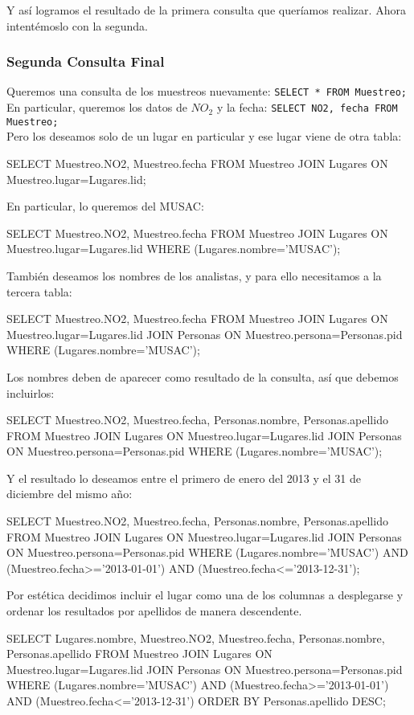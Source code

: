 \documentclass[10pt,letterpaper]{article}
\newcommand{\inlinecode}[1]{
\colorbox{light-gray}{\texttt{#1}}
}
\newenvironment{Code}
{
\begin{lrbox}{\selvestebox}%
\begin{minipage}{\dimexpr\columnwidth-2\fboxsep\relax}
\fontfamily{\ttdefault}\selectfont
}
{\end{minipage}\end{lrbox}%
\begin{center}
\colorbox{light-gray}{\usebox{\selvestebox}}
\end{center}
}
\begin{document}
Y as\'i logramos el resultado de la primera consulta que quer\'iamos realizar. Ahora intent\'emoslo con la segunda.\\

\subsubsection{Segunda Consulta Final}

\noindent Queremos una consulta de los muestreos nuevamente: \inlinecode{SELECT * FROM Muestreo;}\\
En particular, queremos los datos de $NO_2$ y la fecha: \inlinecode{SELECT NO2, fecha FROM Muestreo;}\\
Pero los deseamos solo de un lugar en particular y ese lugar viene de otra tabla:
\begin{Code}
SELECT Muestreo.NO2, Muestreo.fecha FROM Muestreo JOIN Lugares ON Muestreo.lugar=Lugares.lid;
\end{Code}
En particular, lo queremos del MUSAC:
\begin{Code}
SELECT Muestreo.NO2, Muestreo.fecha FROM Muestreo JOIN Lugares ON Muestreo.lugar=Lugares.lid WHERE (Lugares.nombre='MUSAC');
\end{Code}
Tambi\'en deseamos los nombres de los analistas, y para ello necesitamos a la tercera tabla:
\begin{Code}
SELECT Muestreo.NO2, Muestreo.fecha FROM Muestreo JOIN Lugares ON Muestreo.lugar=Lugares.lid JOIN Personas ON Muestreo.persona=Personas.pid WHERE (Lugares.nombre='MUSAC');
\end{Code}
Los nombres deben de aparecer como resultado de la consulta, as\'i que debemos incluirlos:
\begin{Code}
SELECT Muestreo.NO2, Muestreo.fecha, Personas.nombre, Personas.apellido FROM Muestreo JOIN Lugares ON Muestreo.lugar=Lugares.lid JOIN Personas ON Muestreo.persona=Personas.pid WHERE (Lugares.nombre='MUSAC');
\end{Code}
Y el resultado lo deseamos entre el primero de enero del 2013 y el 31 de diciembre del mismo a\~no:
\begin{Code}
SELECT Muestreo.NO2, Muestreo.fecha, Personas.nombre, Personas.apellido FROM Muestreo JOIN Lugares ON Muestreo.lugar=Lugares.lid JOIN Personas ON Muestreo.persona=Personas.pid WHERE (Lugares.nombre='MUSAC') AND (Muestreo.fecha>='2013-01-01') AND (Muestreo.fecha<='2013-12-31');
\end{Code}
Por est\'etica decidimos incluir el lugar como una de los columnas a desplegarse y ordenar los resultados por apellidos de manera descendente.
\begin{Code}
SELECT Lugares.nombre, Muestreo.NO2, Muestreo.fecha, Personas.nombre, Personas.apellido FROM Muestreo JOIN Lugares ON Muestreo.lugar=Lugares.lid JOIN Personas ON Muestreo.persona=Personas.pid WHERE (Lugares.nombre='MUSAC') AND (Muestreo.fecha>='2013-01-01') AND (Muestreo.fecha<='2013-12-31') ORDER BY Personas.apellido DESC;
\end{Code}
\end{document}
